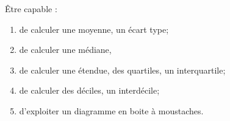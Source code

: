 \begin{myobj}
	Être capable : 
	\begin{enumerate}
		\item de calculer une moyenne, un écart type;
		\item de calculer une médiane, 
		\item de calculer une étendue, des quartiles, un interquartile;
		\item de calculer des déciles, un interdécile;
		\item d'exploiter un diagramme en boite à moustaches.
	\end{enumerate}
\end{myobj}